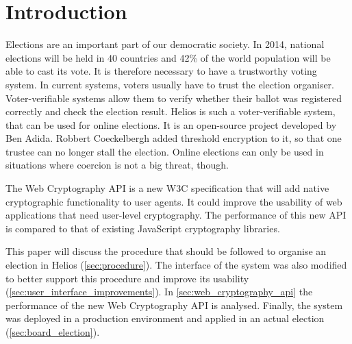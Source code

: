 %
%

\section{Introduction}

Elections are an important part of our democratic society. In 2014, national elections will be held in 40 countries and 42\% of the world population will be able to cast its vote.\cite{news:economist_2014_ballot_boxes} It is therefore necessary to have a trustworthy voting system. In current systems, voters usually have to trust the election organiser. Voter-verifiable systems allow them to verify whether their ballot was registered correctly and check the election result. Helios is such a voter-verifiable system, that can be used for online elections. It is an open-source project developed by Ben Adida.\cite{site:adida_helios_documentation} Robbert Coeckelbergh added threshold encryption to it, so that one trustee can no longer stall the election.\cite{coeckelbergh_application_and_extension_of_the_helios_voting_system} Online elections can only be used in situations where coercion is not a big threat, though. 

\par The Web Cryptography API is a new W3C specification that will add native cryptographic functionality to user agents.\cite{sleevi_watson_web_cryptography_api} It could improve the usability of web applications that need user-level cryptography. The performance of this new API is compared to that of existing JavaScript cryptography libraries.

\par This paper will discuss the procedure that should be followed to organise an election in Helios (\ref{sec:procedure}). The interface of the system was also modified to better support this procedure and improve its usability (\ref{sec:user_interface_improvements}). In \ref{sec:web_cryptography_api} the performance of the new Web Cryptography API is analysed. Finally, the system was deployed in a production environment and applied in an actual election (\ref{sec:board_election}).